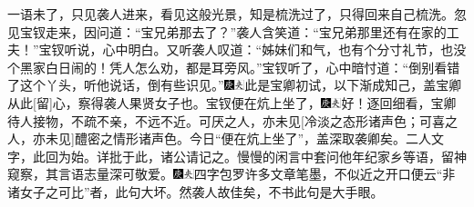 一语未了，只见袭人进来，看见这般光景，知是梳洗过了，只得回来自己梳洗。忽见宝钗走来，因问道：``宝兄弟那去了？''袭人含笑道：``宝兄弟那里还有在家的工夫！''宝钗听说，心中明白。又听袭人叹道：``姊妹们和气，也有个分寸礼节，也没个黑家白日闹的！凭人怎么劝，都是耳旁风。''宝钗听了，心中暗忖道：``倒别看错了这个丫头，听他说话，倒有些识见。''{\includegraphics[width=3mm]{../Images/00004}\includegraphics[width=3mm]{../Images/00012}\footnotesize \kaishu 此是宝卿初试，以下渐成知己，盖宝卿从此{[}留{]}心，察得袭人果贤女子也。}宝钗便在炕上坐了，{\includegraphics[width=3mm]{../Images/00004}\includegraphics[width=3mm]{../Images/00012}\footnotesize \kaishu 好！逐回细看，宝卿待人接物，不疏不亲，不远不近。可厌之人，亦未见{[}冷淡之态形诸声色；可喜之人，亦未见{]}醴密之情形诸声色。今日``便在炕上坐了''，盖深取袭卿矣。二人文字，此回为始。详批于此，诸公请记之。}慢慢的闲言中套问他年纪家乡等语，留神窥察，其言语志量深可敬爱。{\includegraphics[width=3mm]{../Images/00004}\includegraphics[width=3mm]{../Images/00012}\footnotesize \kaishu 四字包罗许多文章笔墨，不似近之开口便云``非诸女子之可比''者，此句大坏。然袭人故佳矣，不书此句是大手眼。}

